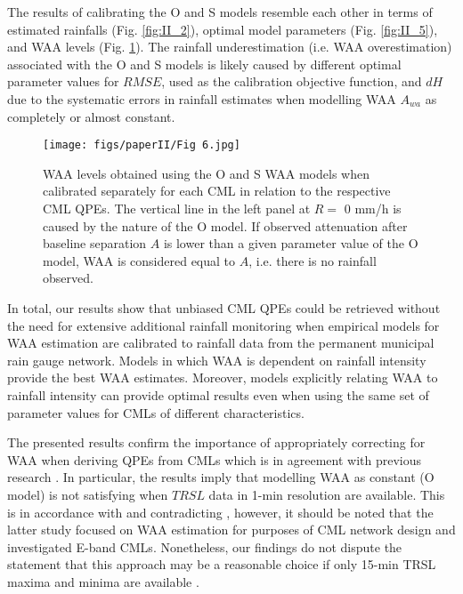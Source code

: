 \documentclass{ctuthesis}\usepackage[]{graphicx}\usepackage[]{color}
\begin{document}
The results of calibrating the O and S models resemble each other in terms of estimated rainfalls (Fig. \ref{fig:II_2}), optimal model parameters (Fig. \ref{fig:II_5}), and WAA levels (Fig. \ref{fig:II_6}). The rainfall underestimation (i.e. WAA overestimation) associated with the O and S models is likely caused by different optimal parameter values for $R\!M\!S\!E$, used as the calibration objective function, and $d\!H$ due to the systematic errors in rainfall estimates when modelling WAA $A_{wa}$ as completely or almost constant.

\begin{figure}[h]
\begin{center}
\texttt{[image: figs/paperII/Fig 6.jpg]}
\caption{WAA levels obtained using the O and S WAA models when calibrated separately for each CML in relation to the respective CML QPEs. The vertical line in the left panel at $R =$ 0 mm/h is caused by the nature of the O model. If observed attenuation after baseline separation $A$ is lower than a given parameter value of the O model, WAA is considered equal to $A$, i.e. there is no rainfall observed.} 
\label{fig:II_6}
\end{center}
\end{figure}

In total, our results show that unbiased CML QPEs could be retrieved without the need for extensive additional rainfall monitoring when empirical models for WAA estimation are calibrated to rainfall data from the permanent municipal rain gauge network. Models in which WAA is dependent on rainfall intensity provide the best WAA estimates. Moreover, models explicitly relating WAA to rainfall intensity can provide optimal results even when using the same set of parameter values for CMLs of different characteristics.

The presented results confirm the importance of appropriately correcting for WAA when deriving QPEs from CMLs which is in agreement with previous research \citep{chwalaCommercialMicrowaveLink2019}. In particular, the results imply that modelling WAA as constant (O model) is not satisfying when $T\!R\!S\!L$ data in 1-min resolution are available. This is in accordance with \cite{pastorekCommercialMicrowaveLinks2019, fenclQuantifyingWetAntenna2019} and contradicting \cite{ostrometzkyWetAntennaEffectFactor2018}, however, it should be noted that the latter study focused on WAA estimation for purposes of CML network design and investigated E-band CMLs. Nonetheless, our findings do not dispute the statement that this approach may be a reasonable choice if only 15-min TRSL maxima and minima are available \citep{chwalaCommercialMicrowaveLink2019}.
\end{document}
